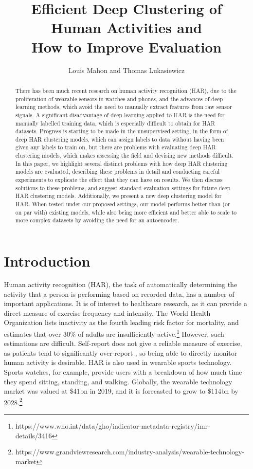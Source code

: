 \documentclass[wcp]{jmlr}
\title{Efficient Deep Clustering of Human Activities and\\ How to Improve Evaluation}
\author{Louis Mahon and Thomas Lukasiewicz}
\begin{document}
\maketitle

\begin{abstract}
There has been much recent research on human activity re\-cog\-ni\-tion (HAR), due to the proliferation of wearable sensors in watches and phones, and the advances of deep learning methods, which avoid the need to manually extract features from raw sensor signals. A significant disadvantage of deep learning applied to HAR is the need for  manually labelled training data, which is especially difficult to obtain for HAR datasets. Progress is starting to be made in the unsupervised setting, in the form of deep HAR clustering models, which can assign labels to data without having been given any labels to train on, but there are problems with evaluating deep HAR clustering models, which makes assessing the field and devising new methods difficult. In this paper, we highlight several distinct problems with how deep HAR clustering models are evaluated, describing these problems in detail and conducting careful experiments to explicate the effect that they can have on results. We then discuss solutions to these problems, and suggest standard evaluation settings for future deep HAR clustering models. Additionally, we present a new deep clustering model for HAR. When tested under our proposed settings, our model performs better than (or on par with) existing models, while also being more efficient and better able to scale to more complex datasets by avoiding the need for an autoencoder.    
\end{abstract}




\section{Introduction}
Human activity recognition (HAR), the task of automatically determining the activity that a person is performing based on recorded data, has a number of important applications. It is of interest to healthcare research, as it can provide a direct measure of exercise frequency and intensity. The World Health Organization lists inactivity as the fourth leading risk factor for mortality, and estimates that over 30\% of adults are insufficiently active.\footnote{https://www.who.int/data/gho/indicator-metadata-registry/imr-details/3416} However, such estimations are difficult. Self-report does not give a reliable measure of exercise, as patients tend to significantly over-report \citep{mcconnell2018mobile}, so being able to directly monitor human activity is desirable. HAR is also used in wearable sports technology. Sports watches, for example, provide users with a breakdown of how much time they spend sitting, standing, and walking. Globally, the wearable technology market was valued at \$41bn in 2019, and it is forecasted to grow to \$114bn by 2028.\footnote{https://www.grandviewresearch.com/industry-analysis/wearable-technology-market} 
\end{document}
